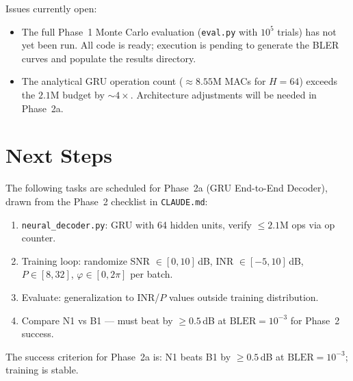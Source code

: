 \documentclass[11pt,a4paper]{article}
\newcommand{\bler}{\text{BLER}}
\begin{document}
\noindent Issues currently open:
\begin{itemize}
  \item[$\circ$] The full Phase~1 Monte Carlo evaluation (\texttt{eval.py} with $10^5$ trials) has not yet been run. All code is ready; execution is pending to generate the BLER curves and populate the results directory.
  \item[$\circ$] The analytical GRU operation count ($\approx 8.55$M MACs for $H{=}64$) exceeds the $2.1$M budget by ${\sim}4\times$. Architecture adjustments will be needed in Phase~2a.
\end{itemize}

\section{Next Steps}

The following tasks are scheduled for Phase~2a (GRU End-to-End Decoder), drawn from the Phase~2 checklist in \texttt{CLAUDE.md}:

\begin{enumerate}
  \item \texttt{neural\_decoder.py}: GRU with 64 hidden units, verify $\leq 2.1$M ops via op counter.
  \item Training loop: randomize SNR $\in [0,10]$\,dB, INR $\in [-5,10]$\,dB, $P \in [8,32]$, $\varphi \in [0,2\pi]$ per batch.
  \item Evaluate: generalization to INR/$P$ values outside training distribution.
  \item Compare N1 vs B1 --- must beat by $\geq 0.5$\,dB at $\bler = 10^{-3}$ for Phase~2 success.
\end{enumerate}

\noindent The success criterion for Phase~2a is: N1 beats B1 by $\geq 0.5$\,dB at $\bler = 10^{-3}$; training is stable.

\end{document}
